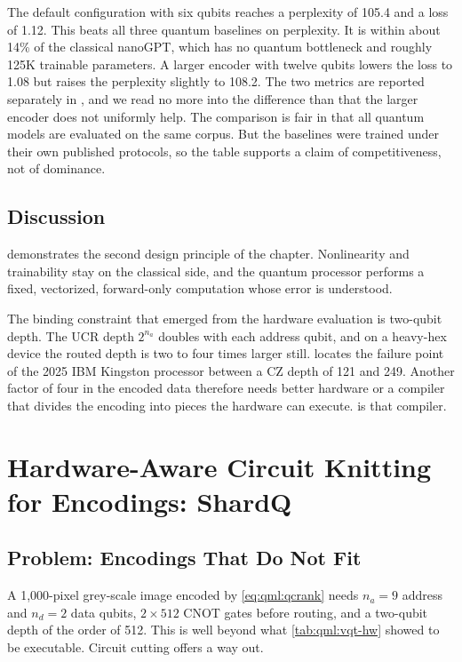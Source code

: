 The default \vqt{} configuration with six qubits reaches a perplexity of 105.4 and a loss of 1.12. This beats all three quantum baselines on perplexity. It is within about 14\% of the classical nanoGPT, which has no quantum bottleneck and roughly 125K trainable parameters. A larger encoder with twelve qubits lowers the loss to 1.08 but raises the perplexity slightly to 108.2. The two metrics are reported separately in \cite{guo2025vqt}, and we read no more into the difference than that the larger encoder does not uniformly help. The comparison is fair in that all quantum models are evaluated on the same corpus. But the baselines were trained under their own published protocols, so the table supports a claim of competitiveness, not of dominance.

\subsection{Discussion}\label{sec:qml:vqt:discussion}

\vqt{} demonstrates the second design principle of the chapter. Nonlinearity and trainability stay on the classical side, and the quantum processor performs a fixed, vectorized, forward-only computation whose error is understood.

The binding constraint that emerged from the hardware evaluation is two-qubit depth. The UCR depth $2^{n_a}$ doubles with each address qubit, and on a heavy-hex device the routed depth is two to four times larger still.  locates the failure point of the 2025 IBM Kingston processor between a CZ depth of 121 and 249. Another factor of four in the encoded data therefore needs better hardware or a compiler that divides the encoding into pieces the hardware can execute. \shardq{} is that compiler.

\section{Hardware-Aware Circuit Knitting for Encodings: ShardQ}\label{sec:qml:shardq}

\subsection{Problem: Encodings That Do Not Fit}\label{sec:qml:shardq:problem}

A 1,000-pixel grey-scale image encoded by \cref{eq:qml:qcrank} needs $n_a = 9$ address and $n_d = 2$ data qubits, $2 \times 512$ CNOT gates before routing, and a two-qubit depth of the order of 512. This is well beyond what \cref{tab:qml:vqt-hw} showed to be executable. Circuit cutting offers a way out.

